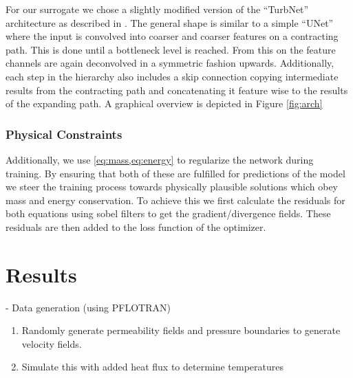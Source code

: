 \documentclass{article} %
\begin{document}
For our surrogate we chose a slightly modified version of the ``TurbNet'' architecture as described in \cite{turbnet}.
The general shape is similar to a simple ``UNet'' \cite{unet} where the input is convolved into coarser and coarser features on a contracting path.
This is done until a bottleneck level is reached.
From this on the feature channels are again deconvolved in a symmetric fashion upwards.
Additionally, each step in the hierarchy also includes a skip connection copying intermediate results from the contracting path and concatenating it feature wise to the results of the expanding path.
A graphical overview is depicted in Figure \ref{fig:arch}





\subsubsection*{Physical Constraints}
Additionally, we use \cref{eq:mass,eq:energy} to regularize the network during training.
By ensuring that both of these are fulfilled for predictions of the model we steer the training process towards physically plausible solutions which obey mass and energy conservation.
To achieve this we first calculate the residuals for both equations using sobel filters to get the gradient/divergence fields.
These residuals are then added to the loss function of the optimizer.




\section{Results}
\label{sec:results}


- Data generation (using PFLOTRAN)
\begin{enumerate}
\item Randomly generate permeability fields and pressure boundaries to generate velocity fields.
\item Simulate this with added heat flux to determine temperatures
\end{enumerate}
\end{document}
